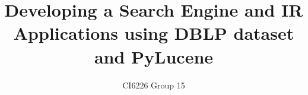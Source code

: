 \documentclass{sig-alternate-05-2015}
\begin{document}






%

\title{Developing a Search Engine and IR Applications using DBLP dataset and PyLucene}
\subtitle{CI6226 Group 15}
%
%
%
%
%
\end{document}
